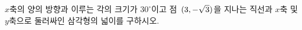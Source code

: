 $x$축의 양의 방향과 이루는 각의 크기가 $30^\circ$이고 점~$(3{,}\mkern3mu\mathopen{}-\sqrt{3})$을 지나는 직선과 $x$축 및 $y$축으로 둘러싸인 삼각형의 넓이를 구하시오.
